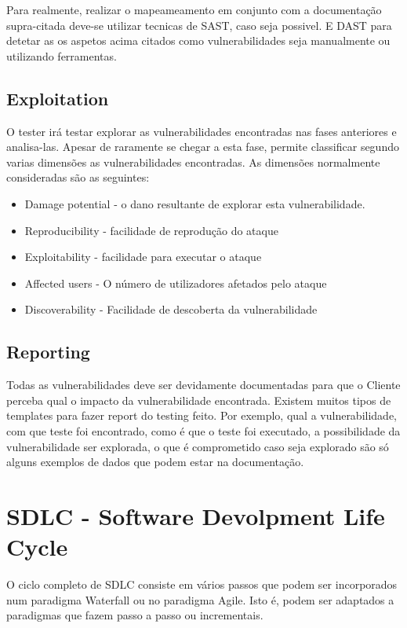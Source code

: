 Para realmente, realizar o mapeameamento em conjunto com a documentação supra-citada deve-se utilizar tecnicas de SAST, caso seja possivel. E DAST para detetar as os aspetos acima citados como vulnerabilidades seja manualmente ou utilizando ferramentas.

\subsection{Exploitation}

O tester irá testar explorar as vulnerabilidades encontradas nas fases anteriores e analisa-las. Apesar de raramente se chegar a esta fase, permite classificar segundo varias dimensões as vulnerabilidades encontradas. As dimensões normalmente consideradas são as seguintes:

\begin{itemize}

\item Damage potential - o dano resultante de explorar esta vulnerabilidade.
\item Reproducibility - facilidade de reprodução do ataque
\item Exploitability - facilidade para executar o ataque
\item Affected users - O número de utilizadores afetados pelo ataque
\item Discoverability - Facilidade de descoberta da vulnerabilidade

\end{itemize}

\subsection{Reporting}

Todas as vulnerabilidades deve ser devidamente documentadas para que o Cliente perceba qual o impacto da vulnerabilidade encontrada. Existem muitos tipos de templates para fazer report do testing feito. Por exemplo, qual a vulnerabilidade, com que teste foi encontrado, como é que o teste foi executado, a possibilidade da vulnerabilidade ser explorada, o que é comprometido caso seja explorado são só alguns exemplos de dados que podem estar na documentação.

\section{ SDLC - Software Devolpment Life Cycle }

O ciclo completo de SDLC consiste em vários passos que podem ser incorporados num paradigma Waterfall ou no paradigma Agile. Isto é, podem ser adaptados a paradigmas que fazem passo a passo ou incrementais.

